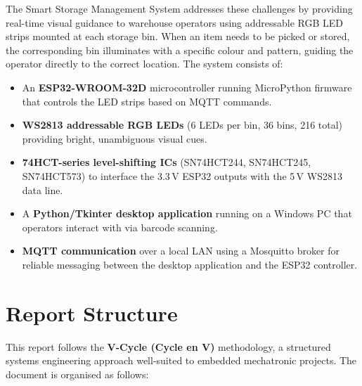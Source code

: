 The Smart Storage Management System addresses these challenges by providing real-time visual guidance to warehouse operators using addressable RGB LED strips mounted at each storage bin. When an item needs to be picked or stored, the corresponding bin illuminates with a specific colour and pattern, guiding the operator directly to the correct location. The system consists of:

\begin{itemize}
  \item An \textbf{ESP32-WROOM-32D}\cite{esp32_trm} microcontroller running MicroPython\cite{micropython_docs} firmware that controls the LED strips based on MQTT commands.
  \item \textbf{WS2813 addressable RGB LEDs}\cite{ws2813_ds} (6 LEDs per bin, 36 bins, 216 total) providing bright, unambiguous visual cues.
  \item \textbf{74HCT-series level-shifting ICs} (SN74HCT244, SN74HCT245, SN74HCT573) to interface the 3.3\,V ESP32 outputs with the 5\,V WS2813 data line.
  \item A \textbf{Python/Tkinter desktop application} running on a Windows PC that operators interact with via barcode scanning.
  \item \textbf{MQTT communication}\cite{oasis_mqtt} over a local LAN using a Mosquitto broker for reliable messaging between the desktop application and the ESP32 controller.
\end{itemize}

\section{Report Structure}
\label{sec:structure}

This report follows the \textbf{V-Cycle (Cycle en V)} methodology, a structured systems engineering approach well-suited to embedded mechatronic projects. The document is organised as follows:

